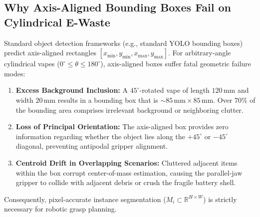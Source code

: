 \documentclass[10pt,a4paper]{article}
\begin{document}
\subsection{Why Axis-Aligned Bounding Boxes Fail on Cylindrical E-Waste}
Standard object detection frameworks (e.g., standard YOLO bounding boxes) predict axis-aligned rectangles $[x_{\min}, y_{\min}, x_{\max}, y_{\max}]$. For arbitrary-angle cylindrical vapes ($0^\circ \le \theta \le 180^\circ$), axis-aligned boxes suffer fatal geometric failure modes:
\begin{enumerate}
    \item \textbf{Excess Background Inclusion:} A $45^\circ$-rotated vape of length $120\,\text{mm}$ and width $20\,\text{mm}$ results in a bounding box that is ${\sim}85\,\text{mm} \times 85\,\text{mm}$. Over $70\%$ of the bounding area comprises irrelevant background or neighboring clutter.
    \item \textbf{Loss of Principal Orientation:} The axis-aligned box provides zero information regarding whether the object lies along the $+45^\circ$ or $-45^\circ$ diagonal, preventing antipodal gripper alignment.
    \item \textbf{Centroid Drift in Overlapping Scenarios:} Cluttered adjacent items within the box corrupt center-of-mass estimation, causing the parallel-jaw gripper to collide with adjacent debris or crush the fragile battery shell.
\end{enumerate}
Consequently, pixel-accurate instance segmentation ($M_i \subset \mathbb{R}^{H \times W}$) is strictly necessary for robotic grasp planning.
\end{document}
